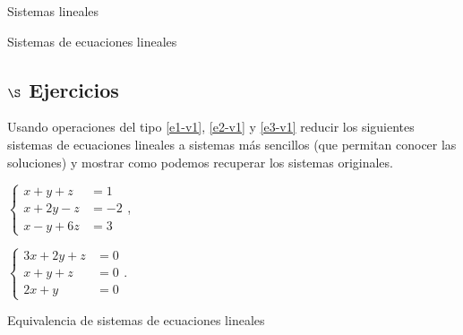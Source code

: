 \begin{chapter}{Sistemas lineales}
\begin{section}{Sistemas de ecuaciones lineales}
\subsection*{$\S$ Ejercicios}
\begin{enumex}
    \item Usando operaciones del tipo  \ref{e1-v1}, \ref{e2-v1} y \ref{e3-v1} reducir los siguientes sistemas de ecuaciones lineales a  sistemas más sencillos (que permitan conocer las soluciones) y mostrar como podemos recuperar los sistemas originales.
    \begin{enumex}
        \begin{minipage}{0.4\textwidth}
        \item $\begin{cases}
            x+y+z &= 1 \\
            x+2y-z&=-2 \\
            x-y+6z &= 3
        \end{cases}$,\end{minipage}
        \begin{minipage}{0.4\textwidth}
        \item $\begin{cases}
            3x +2 y + z &=0 \\
            x+y+z &= 0 \\
            2x +y &=0
        \end{cases}$.\end{minipage}
    \end{enumex}
\end{enumex}


\end{section}


\begin{section}{Equivalencia de sistemas de ecuaciones lineales}\label{seccion-equivalencia-de-sistemas-de-ecuaciones-lineales}


\end{section}
\end{chapter}
